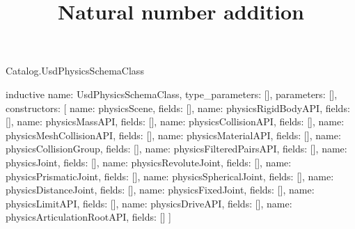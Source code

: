\begin{lexlean}{Catalog.UsdPhysicsSchemaClass}
\title{Natural number addition}
\begin{semanticmodule}
inductive{
  name: UsdPhysicsSchemaClass,
  type_parameters: [],
  parameters: [],
  constructors: [
    {name: physicsScene, fields: []},
    {name: physicsRigidBodyAPI, fields: []},
    {name: physicsMassAPI, fields: []},
    {name: physicsCollisionAPI, fields: []},
    {name: physicsMeshCollisionAPI, fields: []},
    {name: physicsMaterialAPI, fields: []},
    {name: physicsCollisionGroup, fields: []},
    {name: physicsFilteredPairsAPI, fields: []},
    {name: physicsJoint, fields: []},
    {name: physicsRevoluteJoint, fields: []},
    {name: physicsPrismaticJoint, fields: []},
    {name: physicsSphericalJoint, fields: []},
    {name: physicsDistanceJoint, fields: []},
    {name: physicsFixedJoint, fields: []},
    {name: physicsLimitAPI, fields: []},
    {name: physicsDriveAPI, fields: []},
    {name: physicsArticulationRootAPI, fields: []}
  ]
}
\end{semanticmodule}
\end{lexlean}

